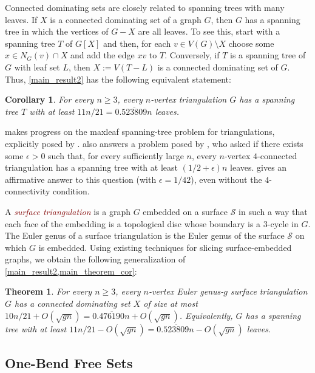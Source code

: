\documentclass{article}
\newtheorem{thm}{Theorem}
\newtheorem{cor}{Corollary}
\newcommand{\defin}[1]{\emph{\textcolor{Maroon}{#1}}}
\theoremstyle{definition}
\begin{document}
Connected dominating sets are closely related to spanning trees with many leaves.  If $X$ is a connected dominating set of a graph $G$, then $G$ has a spanning tree in which the vertices of $G-X$ are all leaves.  To see this, start with a spanning tree $T$ of $G[X]$ and then, for each  $v\in V(G)\setminus X$ choose some $x\in N_G(v)\cap X$ and add the edge $xv$ to $T$. Conversely, if $T$ is a spanning tree of $G$ with leaf set $L$, then $X:=V(T-L)$ is a connected dominating set of $G$.  Thus, \cref{main_result2} has the following equivalent statement:

\begin{cor}\label{main_theorem_cor}
  For every $n\ge 3$, every $n$-vertex triangulation $G$ has a spanning tree $T$ with at least $11n/21= 0.\overline{523809}n$ leaves.
\end{cor}

 makes progress on the maxleaf spanning-tree problem for triangulations, explicitly posed by \citet[Question~4.2]{bradshaw.masarik.ea:robust}.   also answers a problem posed by \citet{noguchi.zamfirescu:spanning}, who asked if there exists some $\epsilon >0$ such that, for every sufficiently large $n$, every $n$-vertex $4$-connected triangulation has a spanning tree with at least $(1/2+\epsilon)n$ leaves.   gives an affirmative answer to this question (with $\epsilon=1/42$), even without the $4$-connectivity condition.

A \defin{surface triangulation} is a graph $G$ embedded on a surface $\mathcal{S}$ in such a way that each face of the embedding is a topological disc whose boundary is a $3$-cycle in $G$.  The Euler genus of a surface triangulation is the Euler genus of the surface $\mathcal{S}$ on which $G$ is embedded.  Using existing techniques for slicing surface-embedded graphs, we obtain the following generalization of \cref{main_result2,main_theorem_cor}:

\begin{thm}\label{genus_result}
  For every $n\ge 3$, every $n$-vertex Euler genus-$g$ surface triangulation $G$ has a connected dominating set $X$ of size at most $10n/21 +O(\sqrt{gn})= 0.\overline{476190}n + O(\sqrt{gn})$.  Equivalently, $G$ has a spanning tree with at least $11n/21 -O(\sqrt{gn})=0.\overline{523809}n-O(\sqrt{gn})$ leaves.
\end{thm}



\subsection{One-Bend Free Sets}
\end{document}
